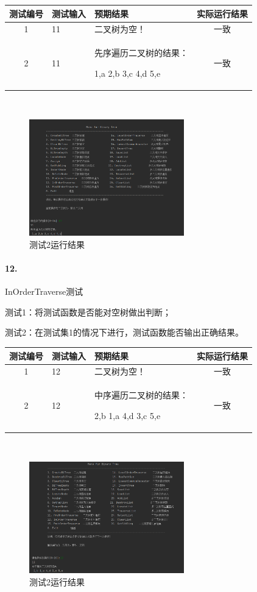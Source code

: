 \documentclass[supercite]{Experimental_Report}
\theoremstyle{definition}
\begin{document}
\begin{tabular}{|c|p{2.7cm}|p{4.5cm}|c|}
	\hline
	测试编号 & 测试输入 & 预期结果 & 实际运行结果 \\
	\hline
	1 & 11 & 二叉树为空！ & 一致 \\
	\hline
	2 & 11 & 先序遍历二叉树的结果：
 
1,a 2,b 3,c 4,d 5,e & 一致 \\
	\hline
\end{tabular}

~\

\begin{figure}[H]
 	\centering
 	\includegraphics[width=0.6\textwidth]{images/二叉树测试11.png}
 	\caption{测试2运行结果}
 	\label{txlab}
 \end{figure}

\paragraph{12.}InOrderTraverse测试

测试1：将测试函数是否能对空树做出判断；

测试2：在测试集1的情况下进行，测试函数能否输出正确结果。

\vspace{0.5em}

\begin{tabular}{|c|p{2.7cm}|p{4.5cm}|c|}
	\hline
	测试编号 & 测试输入 & 预期结果 & 实际运行结果 \\
	\hline
	1 & 12 & 二叉树为空！ & 一致 \\
	\hline
	2 & 12 & 中序遍历二叉树的结果：
 
2,b 1,a 4,d 3,c 5,e & 一致 \\
	\hline
\end{tabular}

~\

\begin{figure}[H]
 	\centering
 	\includegraphics[width=0.6\textwidth]{images/二叉树测试12.png}
 	\caption{测试2运行结果}
 	\label{txlab}
 \end{figure}
\end{document}
